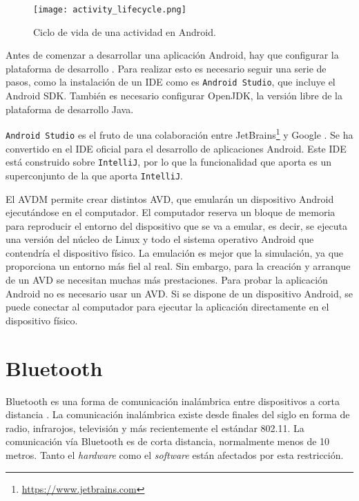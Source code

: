 \begin{figure}[!h]
\begin{center}
\texttt{[image: activity\_lifecycle.png]}
\caption[]{Ciclo de vida de una actividad en Android. \protect\footnotemark}
\label{fig:activity_lifecycle}
\end{center}
\end{figure}


Antes de comenzar a desarrollar una aplicación Android, hay que configurar la plataforma de desarrollo \cite{28}. Para realizar esto es necesario seguir una serie de pasos, como la instalación de un \ac{IDE} como es \texttt{Android Studio}, que incluye el Android \ac{SDK}. También es necesario configurar \ac{OpenJDK}, la versión libre de la plataforma de desarrollo Java.

\texttt{Android Studio} es el fruto de una colaboración entre JetBrains\footnote{\url{https://www.jetbrains.com}} y Google \cite{29}. Se ha convertido en el \ac{IDE} oficial para el desarrollo de aplicaciones Android. Este \ac{IDE} está construido sobre \texttt{IntelliJ}, por lo que la funcionalidad que aporta es un superconjunto de la que aporta \texttt{IntelliJ}. 

El \ac{AVDM} permite crear distintos \ac{AVD}, que emularán un dispositivo Android ejecutándose en el computador. El computador reserva un bloque de memoria para reproducir el entorno del dispositivo que se va a emular, es decir, se ejecuta una versión del núcleo de Linux y todo el sistema operativo Android que contendría el dispositivo físico. La emulación es mejor que la simulación, ya que proporciona un entorno más fiel al real. Sin embargo, para la creación y arranque de un \ac{AVD} se necesitan muchas más prestaciones. Para probar la aplicación Android no es necesario usar un \ac{AVD}. Si se dispone de un dispositivo Android, se puede conectar al computador para ejecutar la aplicación directamente en el dispositivo físico.

\section{Bluetooth}

Bluetooth es una forma de comunicación inalámbrica entre dispositivos a corta distancia \cite{30}. La comunicación inalámbrica existe desde finales del siglo  en forma de radio, infrarojos, televisión y más recientemente el estándar 802.11. La comunicación vía Bluetooth es de corta distancia, normalmente menos de 10 metros. Tanto el \textit{hardware} como el \textit{software} están afectados por esta restricción.

